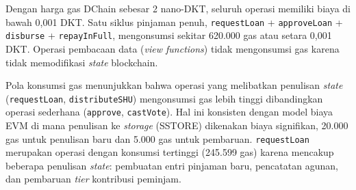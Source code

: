 \begin{table}[H]
\centering
\caption{Konsumsi Gas per Operasi Koperasi pada DChain Mainnet}
\label{tab:gas-costs}
\end{table}

Dengan harga gas DChain sebesar 2 nano-DKT, seluruh operasi memiliki biaya di bawah 0,001 DKT. Satu siklus pinjaman penuh, \texttt{requestLoan} + \texttt{approveLoan} + \texttt{disburse} + \texttt{repayInFull}, mengonsumsi sekitar 620.000 gas atau setara 0,001 DKT. Operasi pembacaan data (\textit{view functions}) tidak mengonsumsi gas karena tidak memodifikasi \textit{state} blockchain.

Pola konsumsi gas menunjukkan bahwa operasi yang melibatkan penulisan \textit{state} (\texttt{requestLoan}, \texttt{distributeSHU}) mengonsumsi gas lebih tinggi dibandingkan operasi sederhana (\texttt{approve}, \texttt{castVote}). Hal ini konsisten dengan model biaya EVM di mana penulisan ke \textit{storage} (SSTORE) dikenakan biaya signifikan, 20.000 gas untuk penulisan baru dan 5.000 gas untuk pembaruan. \texttt{requestLoan} merupakan operasi dengan konsumsi tertinggi (245.599 gas) karena mencakup beberapa penulisan \textit{state}: pembuatan entri pinjaman baru, pencatatan agunan, dan pembaruan \textit{tier} kontribusi peminjam.

